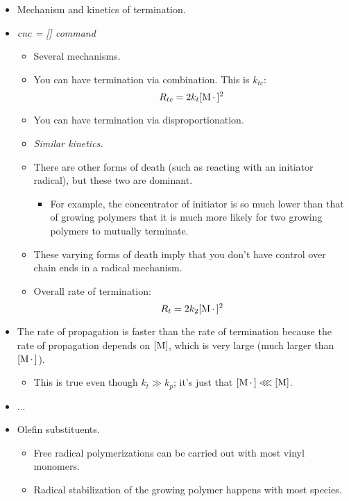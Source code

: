 \documentclass[../notes.tex]{subfiles}
\begin{document}
\begin{itemize}
\begin{itemize}
    \end{itemize}
    \item Mechanism and kinetics of termination.
    \item \emph{cnc = [] command}
    \begin{itemize}
        \item Several mechanisms.
        \item You can have termination via combination. This is $k_{tc}$:
        \begin{equation*}
            R_{tc} = 2k_t[\ce{M*}]^2
        \end{equation*}
        \item You can have termination via disproportionation.
        \item \emph{Similar kinetics.}
        \item There are other forms of death (such as reacting with an initiator radical), but these two are dominant.
        \begin{itemize}
            \item For example, the concentrator of initiator is so much lower than that of growing polymers that it is much more likely for two growing polymers to mutually terminate.
        \end{itemize}
        \item These varying forms of death imply that you don't have control over chain ends in a radical mechanism.
        \item Overall rate of termination:
        \begin{equation*}
            R_t = 2k_2[\ce{M*}]^2
        \end{equation*}
    \end{itemize}
    \item The rate of propagation is faster than the rate of termination because the rate of propagation depends on $[\ce{M}]$, which is very large (much larger than $[\ce{M*}]$).
    \begin{itemize}
        \item This is true even though $k_t\gg k_p$; it's just that $[\ce{M*}]\lll[\ce{M}]$.
    \end{itemize}
    \item ...
    \item Olefin substituents.
    \begin{itemize}
        \item Free radical polymerizations can be carried out with most vinyl monomers.
        \item Radical stabilization of the growing polymer happens with most species.

\end{itemize}
\end{itemize}
\end{document}

